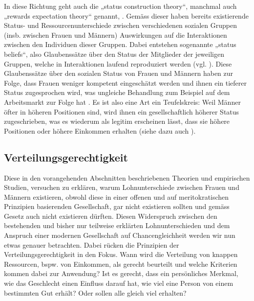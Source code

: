 \documentclass[a4paper,12pt]{article}
\renewcommand{\baselinestretch}{1.1}
\newif\ifcomments
\newcommand{\comment}[1]{%
    \ifcomments\marginpar{\renewcommand{\baselinestretch}{1}\tiny\hspace*{-1.1em}\colorbox{gray!20}%
    {\textcolor{red}{\parbox[t]{.9in}{\raggedright #1}}}}\fi}
\begin{document}
In diese Richtung geht auch die „status construction theory“, manchmal auch „rewards expectation theory“ \citep{Auspurg-etal-2017} genannt, 
\citep{Ridgeway-1997,Ridgeway-2001} \comment{kann man das gleichsetzen?}. Gemäss dieser haben bereits existierende Status- und Ressourcenunterschiede zwischen verschiedenen sozialen Gruppen (insb. zwischen
Frauen und Männern) Auswirkungen auf die Interaktionen zwischen den Individuen
dieser Gruppen. Dabei entstehen sogenannte „status beliefs“, also Glaubenssätze
über den Status der Mitglieder der jeweiligen Gruppen, welche in Interaktionen
laufend reproduziert werden (vgl. \citealp{Goffman-1977}). Diese Glaubenssätze
über den sozialen Status von Frauen und Männern haben zur Folge, dass Frauen
weniger kompetent eingeschätzt werden und ihnen ein tieferer Status
zugesprochen wird, was ungleiche Behandlung zum Beispiel auf dem Arbeitsmarkt
zur Folge hat \citep{Ridgeway-1997}. Es ist also eine Art ein Teufelskreis:
Weil Männer öfter in höheren Positionen sind, wird ihnen ein gesellschaftlich
höherer Status zugeschrieben, was es wiederum als legitim erscheinen lässt,
dass sie höhere Positionen oder höhere Einkommen erhalten (siehe dazu auch
\citealp{Berger-etal-1972}). 

\comment{Abschnitt zu Segregation \& Devaluation hier (siehe comment unten)?}

\subsection{Verteilungsgerechtigkeit} \comment{diesen Abschnitt auch kürzen (und schärfen)}

\comment{statistische D. hat viel mit Vorstellungen zu tun; ähnliche Hinweise
bei Literatur zur Abwertung von Frauenberufen; oder auch die Theorien zur
Spezialisierung aufgrund von Rollen}

Diese in den vorangehenden Abschnitten beschriebenen Theorien und empirischen
Studien, versuchen zu erklären, warum Lohnunterschiede zwischen Frauen und
Männern existieren, obwohl diese in einer offenen und auf meritokratischen
Prinzipien basierenden Gesellschaft, gar nicht existieren sollten und gemäss
Gesetz auch nicht existieren dürften. Diesen Widerspruch zwischen den
bestehenden und bisher nur teilweise erklärten Lohnunterschieden und dem
Anspruch einer modernen Gesellschaft auf Chancengleichheit werden wir nun etwas
genauer betrachten. Dabei rücken die Prinzipien der Verteilungsgerechtigkeit in
den Fokus. Wann wird die Verteilung von knappen Ressourcen, bspw. von
Einkommen, als gerecht beurteilt und welche Kriterien kommen dabei zur
Anwendung? Ist es gerecht, dass ein persönliches Merkmal, wie das Geschlecht
einen Einfluss darauf hat, wie viel eine Person von einem bestimmten Gut
erhält? Oder sollen alle gleich viel erhalten?
\end{document}
